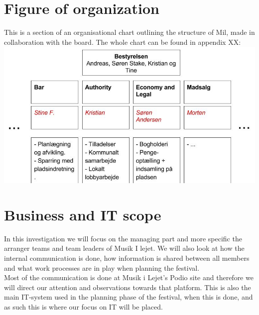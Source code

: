 \section{Figure of organization}
This is a section of an organisational chart outlining the structure of Mil, made in collaboration with the board. The whole chart can be found in appendix XX: \\
\includegraphics[scale=0.5]{Pictures/MIL_Organisational_chart_Cutout.jpg}
\section{Business and IT scope}
In this investigation we will focus on the managing part and more specific the arranger teams and team leaders of Musik I lejet. We will also look at how the internal communication is done, how information is shared between all members and what work processes are in play when planning the festival. \\
Most of the communication is done at Musik i Lejet's Podio site and therefore we will direct our attention and observations towards that platform. This is also the main IT-system used in the planning phase of the festival, when this is done, and as such this is where our focus on IT will be placed.
